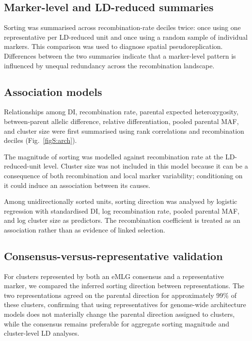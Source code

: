 \documentclass[11pt]{article}
\begin{document}
\subsection{Marker-level and LD-reduced summaries}

Sorting was summarised across recombination-rate deciles twice: once using one
representative per LD-reduced unit and once using a random sample of individual
markers. This comparison was used to diagnose spatial pseudoreplication.
Differences between the two summaries indicate that a marker-level pattern is
influenced by unequal redundancy across the recombination landscape.

\subsection{Association models}

Relationships among DI, recombination rate, parental expected heterozygosity,
between-parent allelic difference, relative differentiation, pooled parental
MAF, and cluster size were first summarised using rank correlations and
recombination deciles (Fig.~\ref{figS:arch}).

The magnitude of sorting was modelled against recombination rate at the
LD-reduced-unit level. Cluster size was not included in this model because it
can be a consequence of both recombination and local marker variability;
conditioning on it could induce an association between its causes.

Among unidirectionally sorted units, sorting direction was analysed by logistic
regression with standardised DI, log recombination rate, pooled parental MAF,
and log cluster size as predictors. The recombination coefficient is treated as
an association rather than as evidence of linked selection.

\subsection{Consensus-versus-representative validation}

For clusters represented by both an eMLG consensus and a representative marker,
we compared the inferred sorting direction between representations. The two
representations agreed on the parental direction for approximately 99\% of these
clusters, confirming that using representatives for genome-wide architecture models
does not materially change the parental direction assigned to clusters, while the
consensus remains preferable for aggregate sorting magnitude and cluster-level LD
analyses.
\end{document}
